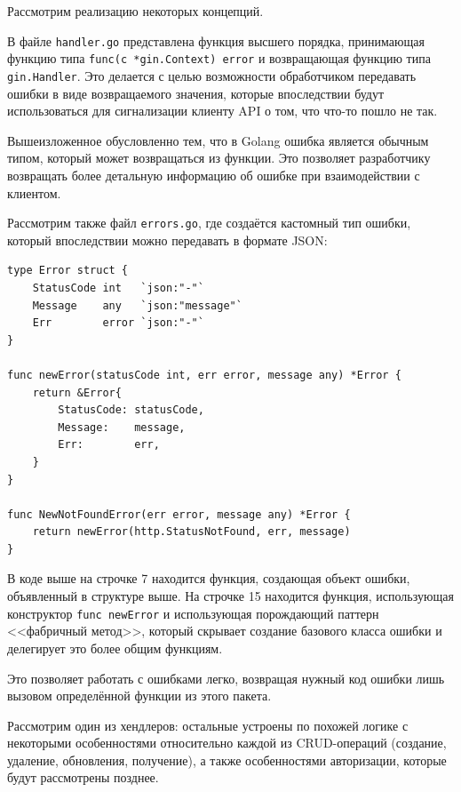 \documentclass[diploma]{SCWorks}
\begin{document}
Рассмотрим реализацию некоторых концепций.

В файле \texttt{handler.go} представлена функция высшего порядка, принимающая
функцию типа \texttt{func(c *gin.Context) error} и возвращающая функцию типа
\texttt{gin.Handler}. Это делается с целью возможности обработчиком передавать
ошибки в виде возвращаемого значения, которые впоследствии будут использоваться
для сигнализации клиенту API о том, что что-то пошло не так.

Вышеизложенное обусловленно тем, что в Golang ошибка является обычным типом,
который может возвращаться из функции. Это позволяет разработчику возвращать 
более детальную информацию об ошибке при взаимодействии с клиентом.

Рассмотрим также файл \texttt{errors.go}, где создаётся кастомный тип ошибки,
который впоследствии можно передавать в формате JSON:

\begin{verbatim}
type Error struct {
    StatusCode int   `json:"-"`
    Message    any   `json:"message"`
    Err        error `json:"-"`
}

func newError(statusCode int, err error, message any) *Error {
    return &Error{
        StatusCode: statusCode,
        Message:    message,
        Err:        err,
    }
}

func NewNotFoundError(err error, message any) *Error {
    return newError(http.StatusNotFound, err, message)
}
\end{verbatim}

В коде выше на строчке 7 находится функция, создающая объект ошибки, объявленный
в структуре выше. На строчке 15 находится функция, использующая конструктор 
\texttt{func newError} и использующая порождающий паттерн <<фабричный метод>>,
который скрывает создание базового класса ошибки и делегирует это более общим
функциям.

Это позволяет работать с ошибками легко, возвращая нужный код ошибки лишь 
вызовом определённой функции из этого пакета.

Рассмотрим один из хендлеров: остальные устроены по похожей логике с некоторыми
особенностями относительно каждой из CRUD-операций (создание, удаление, 
обновления, получение), а также особенностями авторизации, которые будут 
рассмотрены позднее.
\end{document}
